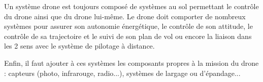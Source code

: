 Un système drone est toujours composé de systèmes au sol permettant le contrôle du drone ainsi que du drone lui-même. Le drone doit comporter de nombreux systèmes pour assurer son autonomie énergétique, le contrôle de son attitude, le contrôle de sa trajectoire et le suivi de son plan de vol ou encore la liaison dans les 2 sens avec le système de pilotage à distance. 

Enfin, il faut ajouter à ces systèmes les composants propres à la mission du drone : capteurs (photo, infrarouge, radio...), systèmes de largage ou d'épandage...
